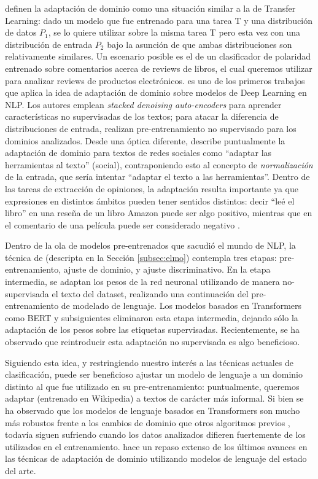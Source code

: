 \citet{goodfellow2016deep} definen la adaptación de dominio como una situación similar a la de Transfer Learning: dado un modelo que fue entrenado para una tarea T y una distribución de datos $P_1$, se lo quiere utilizar sobre la misma tarea T pero esta vez con una distribución de entrada $P_2$ bajo la asunción de que ambas distribuciones son relativamente similares. Un escenario posible es el de un clasificador de polaridad entrenado sobre comentarios acerca de reviews de libros, el cual queremos utilizar para analizar reviews de productos electrónicos. \citet{glorot2011domain} es uno de los primeros trabajos que aplica la idea de adaptación de dominio sobre modelos de Deep Learning en NLP. Los autores emplean \emph{stacked denoising auto-encoders} para aprender características no supervisadas de los textos; para atacar la diferencia de distribuciones de entrada, realizan pre-entrenamiento no supervisado para los dominios analizados. Desde una óptica diferente, \citet{eisenstein2013bad} describe puntualmente la adaptación de dominio para textos de redes sociales como ``adaptar las herramientas al texto'' (social), contraponiendo esto al concepto de \emph{normalización} de la entrada, que sería intentar ``adaptar el texto a las herramientas''. Dentro de las tareas de extracción de opiniones, la adaptación resulta importante ya que expresiones en distintos ámbitos pueden tener sentidos distintos: decir ``leé el libro'' en una reseña de un libro Amazon puede ser algo positivo, mientras que en el comentario de una película puede ser considerado negativo \cite{pang2008opinion}.


Dentro de la ola de modelos pre-entrenados que sacudió el mundo de NLP, la técnica de \ulmfit{} \cite{howard-ruder-2018-universal} (descripta en la Sección \ref{subsec:elmo}) contempla tres etapas: pre-entrenamiento, ajuste de dominio, y ajuste discriminativo. En la etapa intermedia, se adaptan los pesos de la red neuronal utilizando de manera no-supervisada el texto del dataset, realizando una continuación del pre-entrenamiento de modelado de lenguaje. Los modelos basados en Transformers como BERT \cite{devlin2018bert} y subsiguientes eliminaron esta etapa intermedia, dejando sólo la adaptación de los pesos sobre las etiquetas supervisadas. Recientemente, se ha observado que reintroducir esta adaptación no supervisada es algo beneficioso.

Siguiendo esta idea, y restringiendo nuestro interés a las técnicas actuales de clasificación, puede ser beneficioso ajustar un modelo de lenguaje a un dominio distinto al que fue utilizado en su pre-entrenamiento: puntualmente, queremos adaptar \bert{} (entrenado en Wikipedia) a textos de carácter más informal. Si bien se ha observado que los modelos de lenguaje basados en Transformers son mucho más robustos frente a los cambios de dominio que otros algoritmos previos \cite{hendrycks-etal-2020-pretrained}, todavía siguen sufriendo cuando los datos analizados difieren fuertemente de los utilizados en el entrenamiento. \citet{ruder2021lmfine-tuning} hace un repaso extenso de los últimos avances en las técnicas de adaptación de dominio utilizando modelos de lenguaje del estado del arte.


